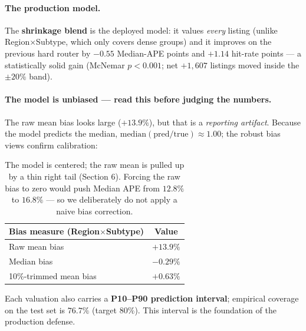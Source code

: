\documentclass[11pt]{article}
\newcommand{\pct}{\%}
\begin{document}
\paragraph{The production model.} The \textbf{shrinkage blend} is the deployed model: it values
\emph{every} listing (unlike Region$\times$Subtype, which only covers dense groups) and it improves on
the previous hard router by $-0.55$ Median-APE points and $+1.14$ hit-rate points --- a statistically
solid gain (McNemar $p<0.001$; net $+1{,}607$ listings moved inside the $\pm 20\pct$ band).

\paragraph{The model is unbiased --- read this before judging the numbers.}
The raw mean bias looks large ($+13.9\pct$), but that is a \emph{reporting artifact}. Because the
model predicts the median, $\text{median}(\text{pred}/\text{true})\approx 1.00$; the robust bias
views confirm calibration:

\begin{table}[h]
\centering
\begin{tabular}{lc}
\toprule
\textbf{Bias measure (Region$\times$Subtype)} & \textbf{Value} \\
\midrule
Raw mean bias & $+13.9\pct$ \\
Median bias & $-0.29\pct$ \\
10\pct-trimmed mean bias & $+0.63\pct$ \\
\bottomrule
\end{tabular}
\caption{The model is centered; the raw mean is pulled up by a thin right tail (Section 6).
Forcing the raw bias to zero would push Median APE from $12.8\pct$ to $16.8\pct$ --- so we
deliberately do not apply a naive bias correction.}
\end{table}

Each valuation also carries a \textbf{P10--P90 prediction interval}; empirical coverage on the test
set is $76.7\pct$ (target $80\pct$). This interval is the foundation of the production defense.

\end{document}
